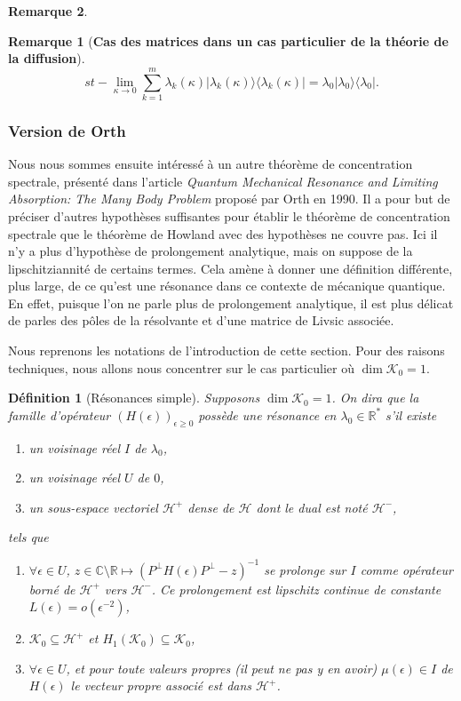 \documentclass[12pt,openany,a4paper, titlepage]{article}
\newcommand{\lp}{\left(}
\newcommand{\rp}{\right)}
\newcommand{\R}{\mathbb{R}}
\newcommand{\C}{\mathbb{C}}
\newtheorem{Def}{Définition}
\theoremstyle{definition}
\theoremstyle{definition}
\theoremstyle{definition}
\theoremstyle{definition}
\theoremstyle{definition}
\newtheorem{rem}{Remarque}
\theoremstyle{definition}
\begin{document}
\begin{rem}
\begin{rem}[\textbf{Cas des matrices dans un cas particulier de la théorie de la diffusion}]
$$st-\lim\limits_{\kappa\rightarrow 0} \sum_{k=1}^m  \lambda_k(\kappa)|\lambda_k(\kappa)\rangle \langle\lambda_k(\kappa)| = \lambda_0|\lambda_0\rangle\langle\lambda_0|.$$
\end{rem}

\subsubsection{Version de Orth}

Nous nous sommes ensuite intéressé à un autre théorème de concentration spectrale, présenté dans l'article \cite{Orth1990} \textit{Quantum Mechanical Resonance
 and Limiting Absorption: The Many Body Problem} proposé par Orth en 1990. Il a pour but de préciser d'autres hypothèses suffisantes pour établir le théorème de concentration spectrale que le théorème de Howland avec des hypothèses ne couvre pas. Ici il n'y a plus d'hypothèse de prolongement analytique, mais on suppose de la lipschitziannité de certains termes. Cela amène à donner une définition différente, plus large, de ce qu'est une résonance dans ce contexte de mécanique quantique. En effet, puisque l'on ne parle plus de prolongement analytique, il est plus délicat de parles des pôles de la résolvante et d'une matrice de Livsic associée.
 
 Nous reprenons les notations de l'introduction de cette section. Pour des raisons techniques, nous allons nous concentrer sur le cas particulier où $\dim \mathcal{K}_0 = 1$. 

 \begin{Def}[Résonances simple]
     Supposons $\dim \mathcal{K}_0 = 1$. On dira que la famille d'opérateur $(H(\epsilon))_{\epsilon \geq 0}$ possède une résonance en $\lambda_0\in\R^*$ s'il existe
     \begin{enumerate}
         \item un voisinage réel $I$ de $\lambda_0$,
         \item un voisinage réel $U$ de $0$,
         \item un sous-espace vectoriel $\mathcal{H}^+$ dense de $\mathcal{H}$ dont le dual est noté $\mathcal{H}^-$,
     \end{enumerate}
     tels que
     \begin{enumerate}
         \item[a)] $\forall \epsilon\in U$, $z\in\C\setminus\R \mapsto \lp P^\perp H(\epsilon)P^\perp - z\rp^{-1}$ se prolonge sur $I$ comme opérateur borné de $\mathcal{H}^+$ vers $\mathcal{H}^-$. Ce prolongement est lipschitz continue de constante $L(\epsilon) = o(\epsilon^{-2})$,
         \item[b)] $\mathcal{K}_0 \subseteq \mathcal{H}^+$ et $H_1(\mathcal{K}_0) \subseteq \mathcal{K}_0$,
         \item[c)] $\forall \epsilon \in U$, et pour toute valeurs propres (il peut ne pas y en avoir) $\mu(\epsilon) \in I$ de $H(\epsilon)$ le vecteur propre associé est dans $\mathcal{H}^+$.
     \end{enumerate}
 \end{Def}


\end{rem}
\end{document}
